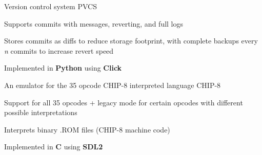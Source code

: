 \begin{cventries}
    \cventry
    {Version control system} %
    {PVCS} %
    {}{}{
        \begin{cvitems} %
            \item {Supports commits with messages, reverting, and full logs}
            \item {Stores commits as diffs to reduce storage footprint, with complete backups every \textit{n} commits to increase revert speed}
            \item {Implemented in \textbf{Python} using \textbf{Click}}
        \end{cvitems}
    }

    \cventry
    {An emulator for the 35 opcode CHIP-8 interpreted language} %
    {CHIP-8} %
    {}{}{
        \begin{cvitems} %
            \item {Support for all 35 opcodes + legacy mode for certain opcodes with different possible interpretations}
            \item {Interprets binary .ROM files (CHIP-8 machine code)}
            \item {Implemented in \textbf{C} using \textbf{SDL2}}
        \end{cvitems}
    }
\end{cventries}
